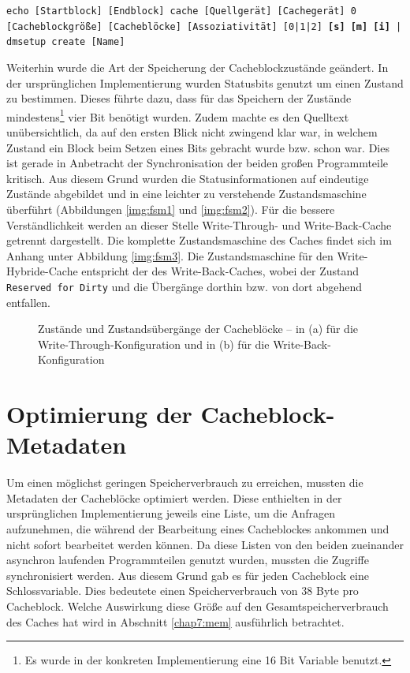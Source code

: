 \begin{flushleft}
\hspace{0.25cm} \small \texttt{echo [Startblock] [Endblock] cache [Quellgerät] [Cachegerät] 0 [Cacheblockgröße] [Cacheblöcke] [Assoziativität] [0|1|2]
\textbf{[s] [m] [i]} | dmsetup create [Name]}
\end{flushleft}

Weiterhin wurde die Art der Speicherung der Cacheblockzustände geändert. In der ursprünglichen Implementierung wurden Statusbits genutzt um einen Zustand zu
bestimmen. Dieses führte dazu, dass für das Speichern der Zustände mindestens\footnote{Es wurde in der konkreten Implementierung eine 16 Bit Variable benutzt.}
vier Bit benötigt wurden. Zudem machte es den Quelltext unübersichtlich, da auf den ersten Blick nicht zwingend klar war, in welchem Zustand ein Block beim
Setzen eines Bits gebracht wurde bzw. schon war. Dies ist gerade in Anbetracht der Synchronisation der beiden großen Programmteile kritisch. Aus diesem Grund
wurden die Statusinformationen auf eindeutige Zustände abgebildet und in eine leichter zu verstehende Zustandsmaschine überführt (Abbildungen \ref{img:fsm1} und
\ref{img:fsm2}). Für die bessere Verständlichkeit werden an dieser Stelle Write-Through- und Write-Back-Cache getrennt dargestellt. Die komplette
Zustandsmaschine des Caches findet sich im Anhang unter Abbildung \ref{img:fsm3}. Die Zustandsmaschine für den Write-Hybride-Cache entspricht der des
Write-Back-Caches, wobei der Zustand \texttt{Reserved for Dirty} und die Übergänge dorthin bzw. von dort abgehend entfallen.

\begin{figure}[H]\centering
	\hfill
	\caption[Zustände und Zustandsübergänge der Cacheblöcke]{Zustände und Zustandsübergänge der Cacheblöcke -- in (a) für die Write-Through-Konfiguration und in (b) für die Write-Back-Konfiguration}
\end{figure}

\section{Optimierung der Cacheblock-Metadaten}
\label{chap6:meta}

Um einen möglichst geringen Speicherverbrauch zu erreichen, mussten die Metadaten der Cacheblöcke optimiert werden. Diese enthielten in der ursprünglichen
Implementierung jeweils eine Liste, um die Anfragen aufzunehmen, die während der Bearbeitung eines Cacheblockes ankommen und nicht sofort bearbeitet werden
können. Da diese Listen von den beiden zueinander asynchron laufenden Programmteilen genutzt wurden, mussten die Zugriffe synchronisiert werden. Aus diesem Grund
gab es für jeden Cacheblock eine Schlossvariable. Dies bedeutete einen Speicherverbrauch von 38 Byte pro Cacheblock. Welche Auswirkung diese Größe auf den
Gesamtspeicherverbrauch des Caches hat wird in Abschnitt \ref{chap7:mem} ausführlich betrachtet.

